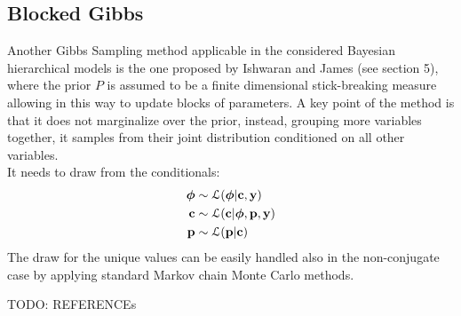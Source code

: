 \subsection{Blocked Gibbs}
Another Gibbs Sampling method applicable in the considered Bayesian hierarchical models is the one proposed by Ishwaran and James (see \cite{james} section 5), where the prior $P$ is assumed to be a finite dimensional stick-breaking measure allowing in this way to update blocks of parameters.
A key point of the method is that it does not marginalize over the prior, instead, grouping more variables together, it samples from their joint distribution conditioned on all other variables. \\
It needs to draw from the conditionals:
\begin{align}
	\boldsymbol\phi &\sim \mathcal L(\boldsymbol\phi | \mathbf{c}, \mathbf{y}) \nonumber \\
	\mathbf{c} &\sim \mathcal L (\mathbf{c}| \boldsymbol\phi,\mathbf{p}, \mathbf{y}) \nonumber \\
	\mathbf{p} &\sim \mathcal L (\mathbf{p}| \mathbf{c}) \nonumber
\end{align}
The draw for the unique values can be easily handled also in the non-conjugate case by applying standard Markov chain Monte Carlo methods.


TODO: REFERENCEs